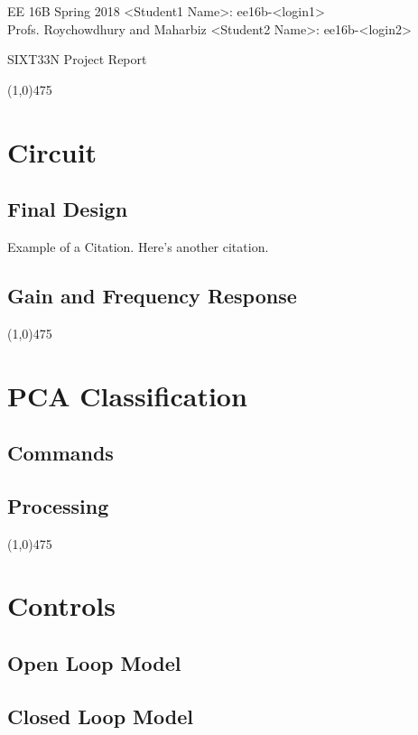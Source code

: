 \documentclass[letterpaper, 11pt]{article}
\newcommand{\hl}{\begin{center} \line(1,0){475} \end{center}} %
\newcommand{\ctitle}[1]{\begin{center} \LARGE{#1} \end{center}} %
\begin{document}
\noindent
EE 16B Spring 2018 \hfill  \textless Student1 Name\textgreater: ee16b-\textless login1\textgreater \\
\normalsize Profs. Roychowdhury and Maharbiz \hfill \textless Student2 Name\textgreater: ee16b-\textless login2\textgreater \\


\ctitle{SIXT33N Project Report}


\hl
\section*{Circuit}
\subsection*{Final Design}
Example of a Citation\cite[p.219]{Robotics}. Here's another citation\cite{Flueck}. 

\noindent \lipsum[1]

\subsection*{Gain and Frequency Response}
\lipsum[2]
\hl 

\section*{PCA Classification}
\subsection*{Commands}
\lipsum[3]

\subsection*{Processing}
\lipsum[4]
\hl 

\section*{Controls}
\subsection*{Open Loop Model}
\lipsum[5]

\subsection*{Closed Loop Model}
\lipsum[6]
\end{document}
